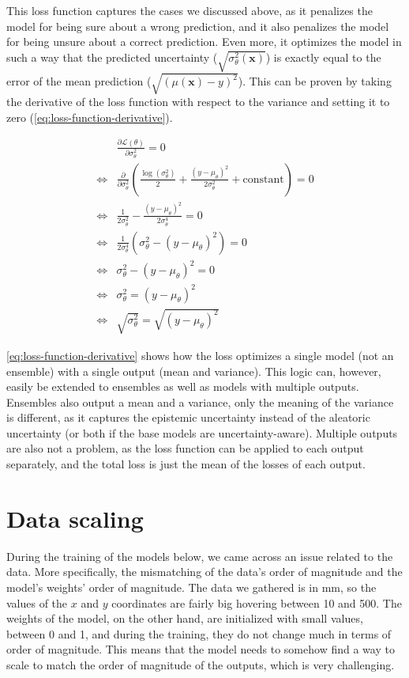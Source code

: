 This loss function captures the cases we discussed above, as it penalizes the model for being sure about a wrong prediction, and it also penalizes the model for being unsure about a correct prediction.
Even more, it optimizes the model in such a way that the predicted uncertainty ($\sqrt{\sigma^2_\theta(\bm{x})}$) is exactly equal to the error of the mean prediction ($\sqrt{(\mu(\bm{x}) - y)^2}$).
This can be proven by taking the derivative of the loss function with respect to the variance and setting it to zero (\cref{eq:loss-function-derivative}).

\begin{equation}\label{eq:loss-function-derivative}
    \begin{aligned}
        &\frac{\partial \mathcal{L}(\theta)}{\partial \sigma^2_\theta} = 0 \\
        \iff& \frac{\partial}{\partial \sigma^2_\theta} \left( \frac{\log(\sigma^2_\theta)}{2} + \frac{(y-\mu_\theta)^2}{2\sigma^2_\theta} + \text{constant} \right) = 0 \\
        \iff& \frac{1}{2\sigma^2_\theta} - \frac{(y-\mu_\theta)^2}{2\sigma^4_\theta} = 0 \\
        \iff& \frac{1}{2\sigma^4_\theta} \left( \sigma^2_\theta - (y-\mu_\theta)^2 \right) = 0 \\
        \iff& \sigma^2_\theta - (y-\mu_\theta)^2 = 0 \\
        \iff& \sigma^2_\theta = (y-\mu_\theta)^2 \\
        \iff& \sqrt{\sigma^2_\theta} = \sqrt{(y-\mu_\theta)^2}
    \end{aligned}
\end{equation}

\cref{eq:loss-function-derivative} shows how the loss optimizes a single model (not an ensemble) with a single output (mean and variance).
This logic can, however, easily be extended to ensembles as well as models with multiple outputs.
Ensembles also output a mean and a variance, only the meaning of the variance is different, as it captures the epistemic uncertainty instead of the aleatoric uncertainty (or both if the base models are uncertainty-aware).
Multiple outputs are also not a problem, as the loss function can be applied to each output separately, and the total loss is just the mean of the losses of each output.

\section{Data scaling}\label{ch:models-for-uncertainty-aware-object-detection_section:data-scaling}
During the training of the models below, we came across an issue related to the data.
More specifically, the mismatching of the data's order of magnitude and the model's weights' order of magnitude.
The data we gathered is in mm, so the values of the $x$ and $y$ coordinates are fairly big hovering between 10 and 500.
The weights of the model, on the other hand, are initialized with small values, between 0 and 1, and during the training, they do not change much in terms of order of magnitude.
This means that the model needs to somehow find a way to scale to match the order of magnitude of the outputs, which is very challenging.

